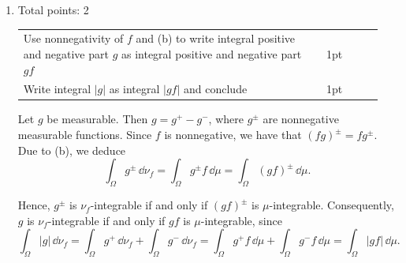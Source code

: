 \documentclass{lecturenotes}
\newcommand{\rubric}[1]{#1}
\begin{document}
\begin{enumerate}[label={(\alph*)}]
{		} 
		
	Following the hint, we start by considering nonnegative simple functions $g$. Suppose $g=\sum_{i=1}^n a_i \mathbf{1}_{A_i}$ for $a_i\in\bbR$ and $A_i\in\cF$ mutually disjoint. Then,
	\[
		\int_\Omega g\,d\nu_f = \sum_{i=1}^n a_i \,\nu_f(A_i) = \sum_{i=1}^n a_i\int_{A_i} f\,\dd\mu = \int_\Omega gf\,\dd\mu.
	\]
	
	Now let $g$ be a nonnegative measurable function and $[g]_n$ be a sequence of nonnegative simple functions that converge pointwise monotonically to $g$. Then MCT yields
	\[
		\int_\Omega g\,\dd\nu_f = \lim_{n\to\infty}\int_\Omega [g]_n\,\dd\nu_f = \lim_{n\to\infty} \int_\Omega [g]_n f\,\dd\mu = \int_\Omega gf\,\dd\mu,
	\]
	where we used the fact that $[g]_n f$ converges pointwise monotonically to $gf$.
	
	\item \rubric{ Total points: 2 \hfill
		
		\begin{tabular}{p{0.8\linewidth}p{0.15\linewidth}}
		\hline
		Use nonnegativity of $f$ and (b) to write integral positive and negative part $g$ as integral positive and negative part $gf$ & 1pt\\
		Write integral $|g|$ as integral $|gf|$ and conclude & 1pt\\
		\hline
		\end{tabular}
		
		} 
		
	Let $g$ be measurable. Then $g=g^+-g^-$, where $g^\pm$ are nonnegative measurable functions. Since $f$ is nonnegative, we have that $(fg)^\pm = f g^\pm$. Due to (b), we deduce
	\[
		\int_\Omega g^\pm\,\dd\nu_f = \int_\Omega g^\pm f\,\dd\mu = \int_\Omega (gf)^\pm\,\dd\mu.
	\]
	
	Hence, $g^\pm$ is $\nu_f$-integrable if and only if $(gf)^\pm$ is $\mu$-integrable. Consequently, $g$ is $\nu_f$-integrable if and only if $gf$ is $\mu$-integrable, since
	\[
		\int_\Omega |g|\,\dd\nu_f = \int_\Omega g^+\,\dd\nu_f + \int_\Omega g^-\,\dd\nu_f = \int_\Omega g^+f\,\dd\mu + \int_\Omega g^-f\,\dd\mu = \int_\Omega |gf|\,\dd\mu.
	\]
\end{enumerate}
\end{document}
